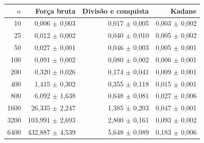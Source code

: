\begin{tabular}{rrrr}
\toprule
$n$ & Força bruta & Divisão e conquista & Kadane \\
\midrule
10 & 0,006 $\pm$ 0,003 & 0,017 $\pm$ 0,005 & 0,003 $\pm$ 0,002 \\
25 & 0,012 $\pm$ 0,002 & 0,040 $\pm$ 0,010 & 0,005 $\pm$ 0,002 \\
50 & 0,027 $\pm$ 0,001 & 0,046 $\pm$ 0,003 & 0,005 $\pm$ 0,001 \\
100 & 0,091 $\pm$ 0,002 & 0,080 $\pm$ 0,002 & 0,006 $\pm$ 0,001 \\
200 & 0,320 $\pm$ 0,026 & 0,174 $\pm$ 0,041 & 0,009 $\pm$ 0,001 \\
400 & 1,415 $\pm$ 0,302 & 0,355 $\pm$ 0,118 & 0,015 $\pm$ 0,001 \\
800 & 6,092 $\pm$ 1,638 & 0,648 $\pm$ 0,081 & 0,027 $\pm$ 0,006 \\
1600 & 26,335 $\pm$ 2,247 & 1,385 $\pm$ 0,203 & 0,047 $\pm$ 0,001 \\
3200 & 103,991 $\pm$ 2,693 & 2,800 $\pm$ 0,161 & 0,093 $\pm$ 0,002 \\
6400 & 432,887 $\pm$ 4,539 & 5,648 $\pm$ 0,089 & 0,183 $\pm$ 0,006 \\
\bottomrule
\end{tabular}

